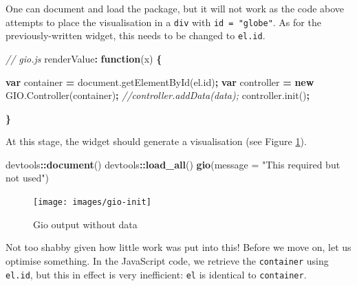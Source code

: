 \documentclass[10pt,]{krantz}
\makeatletter
\newenvironment{Shaded}{\begin{snugshade}}{\end{snugshade}}
\newcommand{\AttributeTok}[1]{\textcolor[rgb]{0.61,0.61,0.61}{#1}}
\newcommand{\CommentTok}[1]{\textcolor[rgb]{0.37,0.37,0.37}{\textit{#1}}}
\newcommand{\DataTypeTok}[1]{\textcolor[rgb]{0.27,0.27,0.27}{#1}}
\newcommand{\KeywordTok}[1]{\textcolor[rgb]{0.27,0.27,0.27}{\textbf{#1}}}
\newcommand{\NormalTok}[1]{#1}
\newcommand{\OperatorTok}[1]{\textcolor[rgb]{0.43,0.43,0.43}{\textbf{#1}}}
\newcommand{\StringTok}[1]{\textcolor[rgb]{0.5,0.5,0.5}{#1}}
\newcommand{\VariableTok}[1]{\textcolor[rgb]{0,0,0}{#1}}
\newenvironment{kframe}{%
\medskip{}
\setlength{\fboxsep}{.8em}
 \def\at@end@of@kframe{}%
 \ifinner\ifhmode%
  \def\at@end@of@kframe{\end{minipage}}%
  \begin{minipage}{\columnwidth}%
 \fi\fi%
 \def\FrameCommand##1{\hskip\@totalleftmargin \hskip-\fboxsep
 \colorbox{shadecolor}{##1}\hskip-\fboxsep
     \hskip-\linewidth \hskip-\@totalleftmargin \hskip\columnwidth}%
 \MakeFramed {\advance\hsize-\width
   \@totalleftmargin\z@ \linewidth\hsize
   \@setminipage}}%
 {\par\unskip\endMakeFramed%
 \at@end@of@kframe}
\renewenvironment{Shaded}{\begin{kframe}}{\end{kframe}}
\makeatother
\begin{document}
One can document and load the package, but it will not work as the code above attempts to place the visualisation in a \texttt{div} with \texttt{id\ =\ "globe"}. As for the previously-written widget, this needs to be changed to \texttt{el.id}.

\begin{Shaded}
\begin{Highlighting}[]
\CommentTok{// gio.js}
\NormalTok{renderValue}\OperatorTok{:} \KeywordTok{function}\NormalTok{(x) }\OperatorTok{\{}

  \KeywordTok{var}\NormalTok{ container }\OperatorTok{=} \VariableTok{document}\NormalTok{.}\AttributeTok{getElementById}\NormalTok{(}\VariableTok{el}\NormalTok{.}\AttributeTok{id}\NormalTok{)}\OperatorTok{;}
  \KeywordTok{var}\NormalTok{ controller }\OperatorTok{=} \KeywordTok{new} \VariableTok{GIO}\NormalTok{.}\AttributeTok{Controller}\NormalTok{(container)}\OperatorTok{;}
  \CommentTok{//controller.addData(data);}
  \VariableTok{controller}\NormalTok{.}\AttributeTok{init}\NormalTok{()}\OperatorTok{;}

\OperatorTok{\}}
\end{Highlighting}
\end{Shaded}

At this stage, the widget should generate a visualisation (see Figure \ref{fig:gio-init}).

\begin{Shaded}
\begin{Highlighting}[]
\NormalTok{devtools}\OperatorTok{::}\KeywordTok{document}\NormalTok{()}
\NormalTok{devtools}\OperatorTok{::}\KeywordTok{load_all}\NormalTok{()}
\KeywordTok{gio}\NormalTok{(}\DataTypeTok{message =} \StringTok{"This required but not used"}\NormalTok{)}
\end{Highlighting}
\end{Shaded}

\begin{figure}[H]

{\centering \texttt{[image: images/gio-init]} 

}

\caption{Gio output without data}\label{fig:gio-init}
\end{figure}

Not too shabby given how little work was put into this! Before we move on, let us optimise something. In the JavaScript code, we retrieve the \texttt{container} using \texttt{el.id}, but this in effect is very inefficient: \texttt{el} is identical to \texttt{container}.
\end{document}
